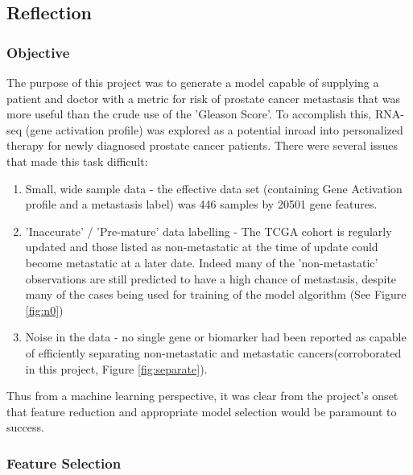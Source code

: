 \documentclass[final]{article}
\begin{document}
\subsection{Reflection}

\subsubsection{Objective}

The purpose of this project was to generate a model capable of supplying a
patient and doctor with a metric for risk of prostate cancer metastasis that was
more useful than the crude use of the 'Gleason Score'.  To accomplish this, RNA-seq
(gene activation profile) was explored as a potential inroad into personalized
therapy for newly diagnosed prostate cancer patients.  There were several issues
that made this task difficult:

\begin{enumerate} \item Small, wide sample data - the effective data set
(containing Gene Activation profile and a metastasis label) was 446 samples by
20501 gene features.
\item 'Inaccurate' / 'Pre-mature' data labelling - The TCGA
cohort is regularly updated and those listed as non-metastatic at the time of
update could become metastatic at a later date.  Indeed many of the
'non-metastatic' observations are still predicted to have a high chance of
metastasis, despite many of the cases being used for training of the model
algorithm (See Figure \ref{fig:n0})
\item Noise in the data - no single gene or
biomarker had been reported as capable of efficiently separating non-metastatic
and metastatic cancers(corroborated in this project, Figure \ref{fig:separate}).
\end{enumerate}

Thus from a machine learning perspective, it was clear from the project's onset
that feature reduction and appropriate model selection would be paramount to
success.

\subsubsection{Feature Selection}
\end{document}

